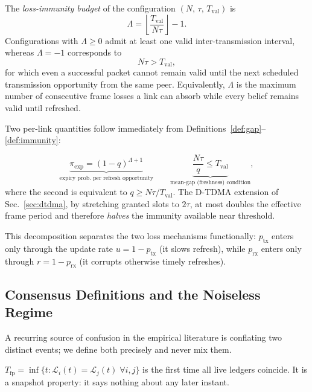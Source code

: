 \begin{definition}\label{def:immunity}
The \emph{loss-immunity budget} of the configuration $(N,\,\tau,\,T_{\mathrm{val}})$ is
\[
\Lambda =
\left\lfloor \frac{T_{\mathrm{val}}}{N\tau}\right\rfloor-1.
\]
Configurations with $\Lambda\geq0$ admit at least one valid inter-transmission interval, whereas $\Lambda=-1$ corresponds to
\[
N\tau>T_{\mathrm{val}},
\]
for which even a successful packet cannot remain valid until the next scheduled transmission opportunity from the same peer. Equivalently, $\Lambda$ is the maximum number of consecutive frame losses a link can absorb while every belief remains valid until refreshed.
\end{definition}

Two per-link quantities follow immediately from Definitions~\ref{def:gap}--\ref{def:immunity}:

\begin{equation}
    \underbrace{\pi_{\mathrm{exp}} = (1-q)^{\Lambda+1}}_{\text{expiry prob.\ per refresh opportunity}}
    \qquad
    \underbrace{\frac{N\tau}{q} \leq T_{\mathrm{val}}}_{\text{mean-gap (freshness) condition}},
    \label{eq:pi-exp}
\end{equation}
where the second is equivalent to $q \geq N\tau / T_{\mathrm{val}}$.
The D-TDMA extension of Sec.~\ref{sec:dtdma}, by stretching granted slots to $2\tau$, at most doubles the effective frame period and therefore \emph{halves} the immunity available near threshold.

This decomposition separates the two loss mechanisms functionally:
$p_{\mathrm{tx}}$ enters only through the update rate $u = 1-p_{\mathrm{tx}}$ (it slows refresh),
while $p_{\mathrm{rx}}$ enters only through $r = 1-p_{\mathrm{rx}}$ (it corrupts otherwise timely refreshes).

\subsection{Consensus Definitions and the Noiseless Regime}\label{sec:theory-noiseless}

A recurring source of confusion in the empirical literature is conflating two distinct events; we define both precisely and never mix them.

\begin{definition}\label{def:firstpassage}
$T_{\mathrm{fp}} = \inf\{ t : \mathcal{L}_i(t) = \mathcal{L}_j(t) \;\forall i,j \}$ is the first time all live ledgers coincide.
It is a snapshot property: it says nothing about any later instant.
\end{definition}

